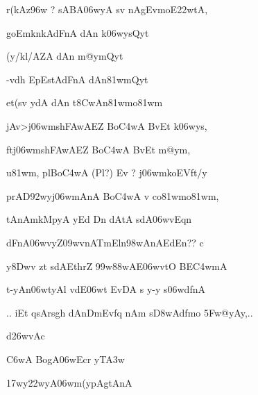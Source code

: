 {\dn r(kAz\396w {\rs ?\re} sABA\306wyA sv\?{\qvb} nAgEvmoE\322wtA, \vegdn\dontdisplaylinenum}

{\dn goEmknkAdFnA\2 dAn\2 k\306wysQyt\?{\dandabdn} \dontdisplaylinenum}

{\dn {}(y/kl/AZA\2 dAn\2 m@ymQyt\? \vegdn\dontdisplaylinenum}

{\dn -vd\?h\2 EpEstAdFnA\2 dAn\381wmQyt\?{\dandabdn} \dontdisplaylinenum}

{\dn et(sv{\rdt} ydA dAn\2 t\38CwAn\381wmo\381wm \vegdn\dontdisplaylinenum}

{\dn jAv>j\306wmsh\3FAwAEZ Bo\3C4wA BvEt k\306wys,{\dandabdn} \dontdisplaylinenum}

{\dn ftj\306wmsh\3FAwAEZ Bo\3C4wA BvEt m@ym, \vegdn\dontdisplaylinenum}

{\dn u\381wm, plBo\3C4wA {\rs (\re}Pl{\rs ?)\re} Ev {\rs ?\re} j\306wmkoEVft/y \dontdisplaylinenum }

{\dn prAD\0\392wyj\306wmAnA\2 Bo\3C4wA v\4 co\381wmo\381wm, \vegdn\dontdisplaylinenum}

{\dn {}tAnAmkMpyA yEd Dn\2 dAtA sdA\306wvEq\0n\?{\dandabdn} \dontdisplaylinenum}

{\dn dFnA\306wvyZ\?\309wvnATmEln\?\398wAnAEdEn{\rs ??\re} c \vegdn\dontdisplaylinenum}

{\dn y\38Dw\?v zt\? sdAEt\0hrZ\2 \399w\388wAE\306wvtO BE\3C4wmA \dontdisplaylinenum}

{\dn t-yAn\306wtyAl\2 vdE\306wt EvDA\2 s y-y s\306wdf\0nA \vegdn\dontdisplaylinenum}

\dnvers

{\dn 
\jump
\begin{center}
{..} iEt qsArs\2g\5h\? dAnDm\0Evf\?q\2 nAm s\3D8wAdfmo \35Fw@yAy,{..}
\end{center}\vers}
\bekveg\szamveg\vfill\phpspagebreak\szam\bek{}
\thispagestyle{empty}



\jump\jump
{\dn d\?\326wvAc{\dandabdn}\dontdisplaylinenum }

\nemsloka

\dnnemsloka 
{\dn {}\3C6wA  BogA\306wEcr\2 yT\?\3A3w\2}
\dontdisplaylinenum

\dnnemslokab 
{\dn {}\317wy\322wyA\306wm(y\0pAgtAnA \dandadn\dontdisplaylinenum}

